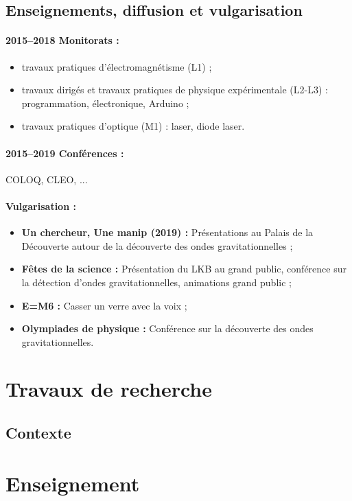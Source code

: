 \documentclass[12pt,a4paper]{article}
\begin{document}
\subsection{Enseignements, diffusion et vulgarisation}

\paragraph{2015--2018 Monitorats :}
\begin{itemize}
\item travaux pratiques d'électromagnétisme (L1) ;
\item travaux dirigés et travaux pratiques de physique expérimentale (L2-L3) : programmation, électronique, Arduino ;
\item travaux pratiques d'optique (M1) : laser, diode laser.
\end{itemize}

\paragraph{2015--2019 Conférences :} COLOQ, CLEO, ... 

\paragraph{Vulgarisation :}
\begin{itemize}
\item \textbf{Un chercheur, Une manip (2019) :} Présentations au Palais de la Découverte autour de la découverte des ondes gravitationnelles ;
\item \textbf{Fêtes de la science :} Présentation du LKB au grand public, conférence sur la détection d'ondes gravitationnelles, animations grand public ;
\item \textbf{E=M6 :} Casser un verre avec la voix ;
\item \textbf{Olympiades de physique :} Conférence sur la découverte des ondes gravitationnelles.
\end{itemize}

\section{Travaux de recherche}

\subsection{Contexte}

\section{Enseignement}
\end{document}
